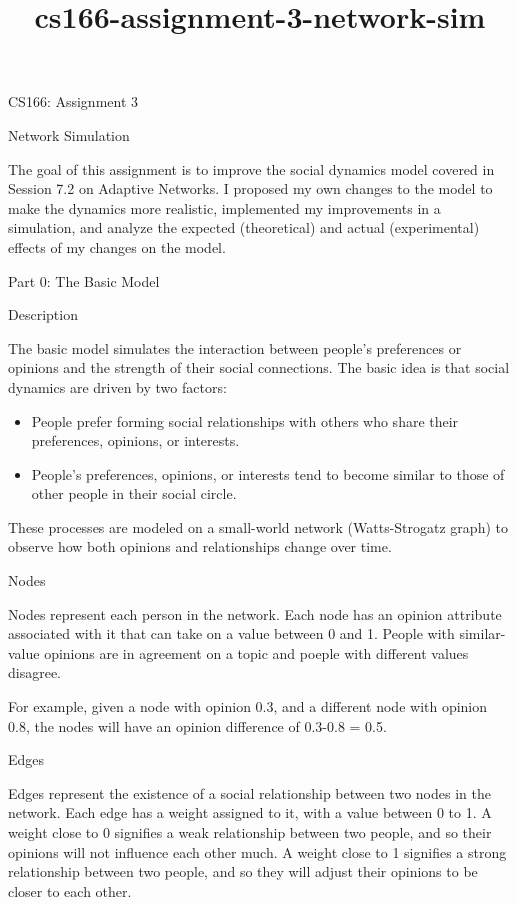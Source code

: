 \documentclass[11pt]{article}
\title{cs166-assignment-3-network-sim}
\begin{document}
    
    
    \maketitle
    
    

    
    CS166: Assignment 3

Network Simulation

The goal of this assignment is to improve the social dynamics model
covered in Session 7.2 on Adaptive Networks. I proposed my own changes
to the model to make the dynamics more realistic, implemented my
improvements in a simulation, and analyze the expected (theoretical) and
actual (experimental) effects of my changes on the model.

    Part 0: The Basic Model

Description

The basic model simulates the interaction between people's preferences
or opinions and the strength of their social connections. The basic idea
is that social dynamics are driven by two factors:

\begin{itemize}
\item
  People prefer forming social relationships with others who share their
  preferences, opinions, or interests.
\item
  People's preferences, opinions, or interests tend to become similar to
  those of other people in their social circle.
\end{itemize}

These processes are modeled on a small-world network (Watts-Strogatz
graph) to observe how both opinions and relationships change over time.

Nodes

Nodes represent each person in the network. Each node has an opinion
attribute associated with it that can take on a value between 0 and 1.
People with similar-value opinions are in agreement on a topic and
poeple with different values disagree.

For example, given a node with opinion 0.3, and a different node with
opinion 0.8, the nodes will have an opinion difference of
\textbar{}0.3-0.8\textbar{} = 0.5.

Edges

Edges represent the existence of a social relationship between two nodes
in the network. Each edge has a weight assigned to it, with a value
between 0 to 1. A weight close to 0 signifies a weak relationship
between two people, and so their opinions will not influence each other
much. A weight close to 1 signifies a strong relationship between two
people, and so they will adjust their opinions to be closer to each
other.
\end{document}

